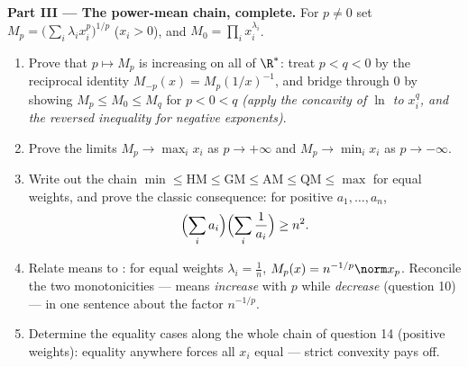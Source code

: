 \begin{problem}
\medskip
\noindent\textbf{Part III --- The power-mean chain, complete.}
For $p \neq 0$ set $M_p = \bigl(\sum_i\lambda_i
x_i^p\bigr)^{1/p}$ ($x_i > 0$), and $M_0 = \prod_i
x_i^{\lambda_i}$.
\begin{enumerate}[resume]
  \item Prove that $p \mapsto M_p$ is increasing on all of
        $\R^*$: treat $p < q < 0$ by the reciprocal identity
        $M_{-p}(x) = M_p(1/x)^{-1}$, and bridge through $0$ by
        showing $M_p \leq M_0 \leq M_q$ for $p < 0 < q$
        \emph{(apply the concavity of $\ln$ to $x_i^q$, and the
        reversed inequality for negative exponents)}.
  \item Prove the limits $M_p \to \max_i x_i$ as $p \to
        +\infty$ and $M_p \to \min_i x_i$ as $p \to -\infty$.
  \item Write out the chain $\min \leq \mathrm{HM} \leq
        \mathrm{GM} \leq \mathrm{AM} \leq \mathrm{QM} \leq
        \max$ for equal weights, and prove the classic
        consequence: for positive $a_1, \dots, a_n$,
        \[
        \Bigl(\sum_i a_i\Bigr)\Bigl(\sum_i\frac1{a_i}\Bigr)
        \geq n^2 .
        \]
  \item Relate means to : for equal weights $\lambda_i =
        \frac1n$, $M_p(x) = n^{-1/p}\norm x_p$. Reconcile the
        two monotonicities --- means \emph{increase} with $p$
        while  \emph{decrease} (question 10) --- in one
        sentence about the factor $n^{-1/p}$.
  \item Determine the equality cases along the whole chain of
        question 14 (positive weights): equality anywhere
        forces all $x_i$ equal --- strict convexity pays off.
\end{enumerate}


\end{problem}
